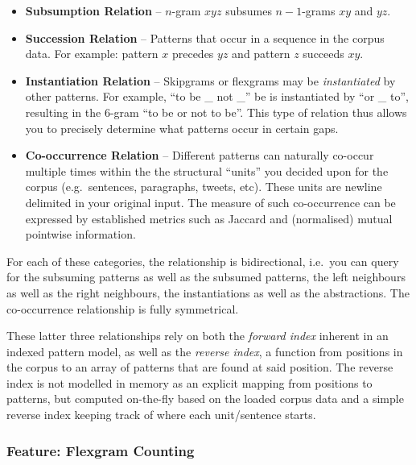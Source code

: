 \documentclass[a4paper,12pt]{article}
\begin{document}
\begin{itemize}
 \item \textbf{Subsumption Relation} -- $n$-gram $x y z$ subsumes $n-1$-grams $x y$ and $y z$. 
 \item \textbf{Succession Relation} -- Patterns that occur in a sequence in the
     corpus data. For example: pattern $x$ precedes $yz$ and pattern $z$ succeeds $xy$.
 \item \textbf{Instantiation Relation} -- Skipgrams or flexgrams may be
     \emph{instantiated} by other patterns. For example, ``to be \_ not \_'' be
     is instantiated by ``or \_ to'', resulting in the 6-gram ``to be or not to be''. This type of relation thus allows you to precisely determine what patterns occur in certain gaps.
 \item \textbf{Co-occurrence Relation} -- Different patterns can naturally co-occur multiple times
     within the the structural ``units'' you decided upon for the corpus (e.g.\ 
     sentences, paragraphs, tweets, etc). These units are newline delimited in
     your original input. The measure of such co-occurrence 
     can be expressed by established metrics such as Jaccard and (normalised) mutual
     pointwise information.
\end{itemize}

For each of these categories, the relationship is bidirectional, i.e.\ you can
query for the subsuming patterns as well as the subsumed patterns, the left
neighbours as well as the right neighbours, the instantiations as well as the
abstractions. The co-occurrence relationship is fully symmetrical. 

These latter three relationships rely on both the \emph{forward index} inherent
in an indexed pattern model, as well as the \emph{reverse index}, a function
from positions in the corpus to an array of patterns that are found at said
position. The reverse index is not modelled in memory as an explicit mapping from
positions to patterns, but computed on-the-fly based on the loaded corpus data
and a simple reverse index keeping track of where each unit/sentence starts.

\subsubsection{Feature: Flexgram Counting}
\end{document}
